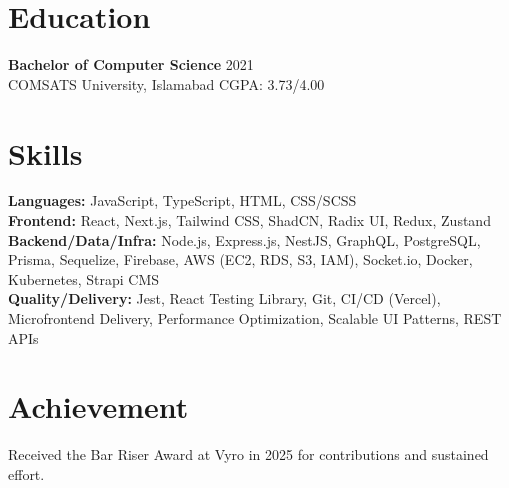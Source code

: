 \documentclass[9pt,letterpaper]{article}
\begin{document}
\section*{Education}
\textbf{Bachelor of Computer Science} \hfill 2021 \\
COMSATS University, Islamabad \hfill CGPA: 3.73/4.00

\section*{Skills}
\textbf{Languages:} JavaScript, TypeScript, HTML, CSS/SCSS \\
\textbf{Frontend:} React, Next.js, Tailwind CSS, ShadCN, Radix UI, Redux, Zustand \\
\textbf{Backend/Data/Infra:} Node.js, Express.js, NestJS, GraphQL, PostgreSQL, Prisma, Sequelize, Firebase, AWS (EC2, RDS, S3, IAM), Socket.io, Docker, Kubernetes, Strapi CMS \\
\textbf{Quality/Delivery:} Jest, React Testing Library, Git, CI/CD (Vercel), Microfrontend Delivery, Performance Optimization, Scalable UI Patterns, REST APIs

\section*{Achievement}
Received the Bar Riser Award at Vyro in 2025 for contributions and sustained effort.
\end{document}

